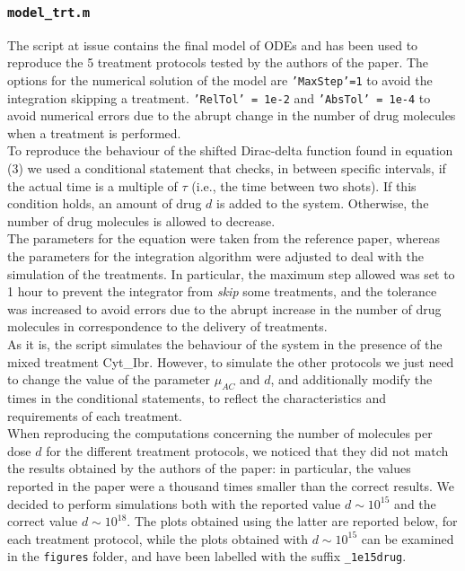 \subsubsection{\texttt{model\_trt.m}}
The script at issue contains the final model of ODEs and has been used to reproduce the 5 treatment protocols tested by the authors of the paper. The options for the numerical solution of the model are \texttt{'MaxStep'=1} to avoid the integration skipping a treatment. \texttt{'RelTol' = 1e-2} and \texttt{'AbsTol' = 1e-4} to avoid numerical errors due to the abrupt change in the number of drug molecules when a treatment is performed.\\
To reproduce the behaviour of the shifted Dirac-delta function found in equation (3) we used a conditional statement that checks, in between specific intervals, if the actual time is a multiple of $\tau$ (i.e., the time between two shots). If this condition holds, an amount of drug $d$ is added to the system. Otherwise, the number of drug molecules is allowed to decrease.\\
The parameters for the equation were taken from the reference paper, whereas the parameters for the integration algorithm were adjusted to deal with the simulation of the treatments. In particular, the maximum step allowed was set to 1 hour to prevent the integrator from \textit{skip} some treatments, and the tolerance was increased to avoid errors due to the abrupt increase in the number of drug molecules in correspondence to the delivery of treatments.\\
As it is, the script simulates the behaviour of the system in the presence of the mixed treatment Cyt\_Ibr. However, to simulate the other protocols we just need to change the value of the parameter $\mu_{AC}$ and $d$, and additionally modify the times in the conditional statements, to reflect the characteristics and requirements of each treatment. \\
When reproducing the computations concerning the number of molecules per dose $d$ for the different treatment protocols, we noticed that they did not match the results obtained by the authors of the paper: in particular, the values reported in the paper were a thousand times smaller than the correct results. We decided to perform simulations both with the reported value $d \sim 10^{15}$ and the correct value $d \sim 10^{18}$. The plots obtained using the latter are reported below, for each treatment protocol, while the plots obtained with $d \sim 10^{15}$ can be examined in the \texttt{figures} folder, and have been labelled with the suffix \texttt{\_1e15drug}. \\
